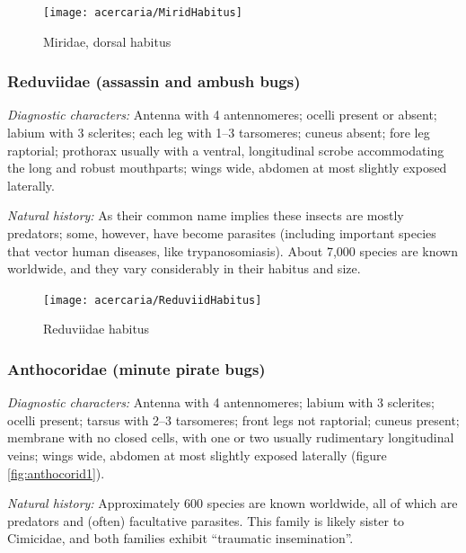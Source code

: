 \begin{figure}[ht!]
 \centering
 \texttt{[image: acercaria/MiridHabitus]}
 \caption{Miridae, dorsal habitus \citep[][Plate II, Fig. 1]{bhl132930}}
 \label{fig:mirid}
\end{figure}

\subsubsection{Reduviidae (assassin and ambush bugs)}
\noindent{}\textit{Diagnostic characters:} Antenna with 4 antennomeres; ocelli present or absent; labium with 3 sclerites; each leg with 1--3 tarsomeres; cuneus absent; fore leg raptorial; prothorax usually with a ventral, longitudinal scrobe accommodating the long and robust mouthparts; wings wide, abdomen at most slightly exposed laterally.\vspace{3mm}

\noindent{}\textit{Natural history:} As their common name implies these insects are mostly predators; some, however, have become parasites (including important species that vector human diseases, like trypanosomiasis). About 7,000 species are known worldwide, and they vary considerably in their habitus and size.\vspace{3mm}

\begin{figure}[ht!]
 \centering
 \texttt{[image: acercaria/ReduviidHabitus]}
 \caption{Reduviidae habitus \citep[redrawn from][Plate XXXII, Fig. 12]{bhlitem82061AustrInsect}}
 \label{fig:reduviid1}
\end{figure}

\subsubsection{Anthocoridae (minute pirate bugs)}
\noindent{}\textit{Diagnostic characters:} Antenna with 4 antennomeres; labium with 3 sclerites; ocelli present; tarsus with 2--3 tarsomeres; front legs not raptorial; cuneus present; membrane with no closed cells, with one or two usually rudimentary longitudinal veins; wings wide, abdomen at most slightly exposed laterally (figure \ref{fig:anthocorid1}).\vspace{3mm}

\noindent{}\textit{Natural history:} Approximately 600 species are known worldwide, all of which are predators and (often) facultative parasites. This family is likely sister to Cimicidae, and both families exhibit ``traumatic insemination''.\vspace{3mm}

